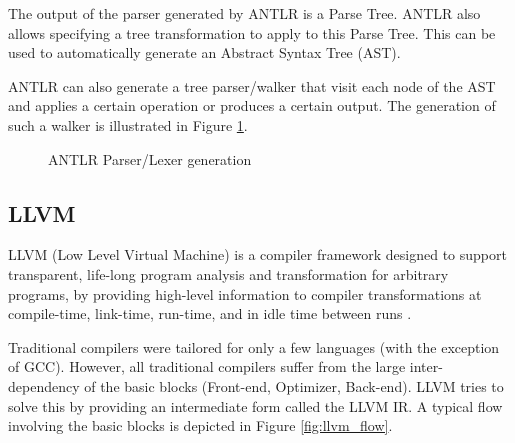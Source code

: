 The output of the parser generated by ANTLR is a Parse Tree. ANTLR
also allows specifying a tree transformation to apply to this Parse
Tree. This can be used to automatically generate an Abstract Syntax
Tree (AST).

ANTLR can also generate a tree parser/walker that visit each node of
the AST and applies a certain operation or produces a certain
output. The generation of such a walker is illustrated in Figure
\ref{fig:antlr_tree_walker}.

\begin{figure}[hbt!]
  \centering
  \caption{ANTLR Parser/Lexer generation}
  \label{fig:antlr_tree_walker}
\end{figure}

\subsection{LLVM}

LLVM (Low Level Virtual Machine) is a compiler framework designed to
support transparent, life-long program analysis and transformation
for arbitrary programs, by providing high-level information to
compiler transformations at compile-time, link-time, run-time, and in
idle time between runs \cite{LLVM:CGO04}.

Traditional compilers were tailored for only a few languages (with the
exception of GCC). However, all traditional compilers suffer from the
large inter-dependency of the basic blocks (Front-end, Optimizer,
Back-end). LLVM tries to solve this by providing an intermediate form
called the LLVM IR. A typical flow involving the basic blocks is
depicted in Figure \ref{fig:llvm_flow}.

